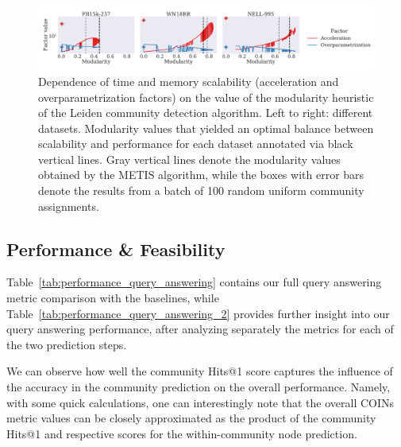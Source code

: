 \begin{figure}[H]
\begin{center}
\includegraphics[width=\textwidth]{figures/coins/scalability_leiden_modularity}
\end{center}
\caption[Dependence of time and memory scalability on the value of the modularity heuristic of the Leiden community detection algorithm.]{Dependence of time and memory scalability (acceleration and overparametrization factors) on the value of the modularity heuristic of the Leiden community detection algorithm. Left to right: different datasets. Modularity values that yielded an optimal balance between scalability and performance for each dataset annotated via black vertical lines. Gray vertical lines denote the modularity values obtained by the METIS algorithm, while the boxes with error bars denote the results from a batch of 100 random uniform community assignments.}
\label{fig:scalability_modularity}
\end{figure}

\subsection{Performance \& Feasibility}

Table~\ref{tab:performance_query_answering} contains our full query answering metric comparison with the baselines, while Table~\ref{tab:performance_query_answering_2} provides further insight into our query answering performance, after analyzing separately the metrics for each of the two prediction steps. 

We can observe how well the community Hits@1 score captures the influence of the accuracy in the community prediction on the overall performance. Namely, with some quick calculations, one can interestingly note that the overall COINs metric values can be closely approximated as the product of the community Hits@1 and respective scores for the within-community node prediction.

